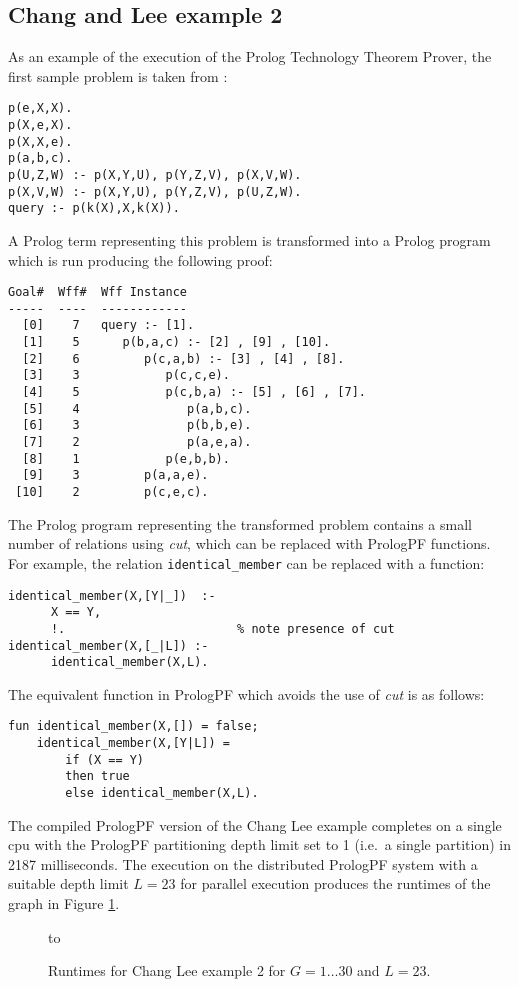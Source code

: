 \subsection{Chang and Lee example 2}

As an example of the execution of the Prolog Technology Theorem Prover, 
the first sample problem is taken from \cite{CL73}:
\begin{verbatim}
p(e,X,X).
p(X,e,X).
p(X,X,e).
p(a,b,c).
p(U,Z,W) :- p(X,Y,U), p(Y,Z,V), p(X,V,W).
p(X,V,W) :- p(X,Y,U), p(Y,Z,V), p(U,Z,W).
query :- p(k(X),X,k(X)).
\end{verbatim}
A Prolog term representing this problem is transformed into a Prolog program which
is run producing the following proof:
\begin{verbatim}
Goal#  Wff#  Wff Instance
-----  ----  ------------
  [0]    7   query :- [1].
  [1]    5      p(b,a,c) :- [2] , [9] , [10].
  [2]    6         p(c,a,b) :- [3] , [4] , [8].
  [3]    3            p(c,c,e).
  [4]    5            p(c,b,a) :- [5] , [6] , [7].
  [5]    4               p(a,b,c).
  [6]    3               p(b,b,e).
  [7]    2               p(a,e,a).
  [8]    1            p(e,b,b).
  [9]    3         p(a,a,e).
 [10]    2         p(c,e,c).
\end{verbatim}
The Prolog program representing the transformed problem contains a small number of
relations using \textit{cut}, which can be replaced with PrologPF functions.  For
example, the relation \texttt{identical\_{}member} can be replaced with a function:
\begin{verbatim}
identical_member(X,[Y|_])  :-
      X == Y,
      !.                        % note presence of cut
identical_member(X,[_|L]) :-
      identical_member(X,L).
\end{verbatim}
The equivalent function in PrologPF which avoids the use of \textit{cut} is as
follows: 
\begin{verbatim}
fun identical_member(X,[]) = false;
    identical_member(X,[Y|L]) =
        if (X == Y)
        then true
        else identical_member(X,L).
\end{verbatim}
The compiled PrologPF version of the Chang Lee example completes on a single cpu with
the PrologPF partitioning depth limit set to 1 (i.e.\ a single partition) in
2187 milliseconds.  The execution on the distributed PrologPF system with a
suitable depth limit $L=23$ for parallel execution produces the
runtimes of the graph in Figure \ref{changlee2_L_23_runtime}.

\begin{figure}[htbp]
\vspace{5mm} \hbox to 
\caption{Runtimes for Chang Lee example 2 for $G=1\ldots 30$ and $L=23$.}
\vspace{5mm}
\label{changlee2_L_23_runtime}
\end{figure}

